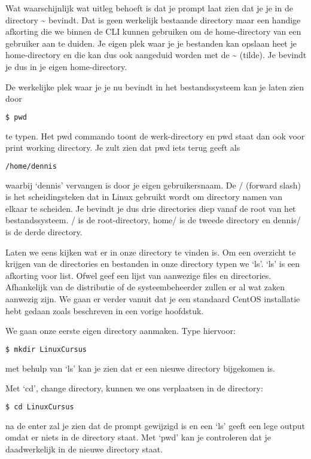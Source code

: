 Wat waarschijnlijk wat uitleg behoeft is dat je prompt laat zien dat je je in de directory \~{} bevindt. Dat is geen
werkelijk bestaande directory maar een handige afkorting die we binnen de CLI kunnen gebruiken om de home-directory van
een gebruiker aan te duiden. Je eigen plek waar je je bestanden kan opslaan heet je home-directory en die kan dus ook
aangeduid worden met de \~{} (tilde). Je bevindt je dus in je eigen home-directory.

De werkelijke plek waar je je nu bevindt in het bestandssysteem kan je laten zien door
\begin{lstlisting}[language=bash]
$ pwd
\end{lstlisting}
te typen. Het pwd commando toont de werk-directory en pwd staat dan ook voor print working directory. Je zult zien dat
pwd iets terug geeft als
\begin{lstlisting}[language=bash]
/home/dennis
\end{lstlisting}
waarbij `dennis' vervangen is door je eigen gebruikersnaam. De / (forward slash) is het scheidingsteken dat in Linux
gebruikt wordt om directory namen van elkaar te scheiden. Je bevindt je dus drie directories diep vanaf de root van het
bestandssysteem. / is de root-directory, home/ is de tweede directory en dennis/ is de derde directory.

Laten we eens kijken wat er in onze directory te vinden is. Om een overzicht te krijgen van de directories en bestanden
in onze directory typen we `ls'. `ls' is een afkorting voor list. Ofwel geef een lijst van aanwezige files en
directories. Afhankelijk van de distributie of de systeembeheerder zullen er al wat zaken aanwezig zijn. We gaan er
verder vanuit dat je een standaard CentOS installatie hebt gedaan zoals beschreven in een vorige hoofdstuk.

We gaan onze eerste eigen directory aanmaken. Type hiervoor:
\begin{lstlisting}[language=bash]
$ mkdir LinuxCursus
\end{lstlisting}
met behulp van `ls' kan je zien dat er een nieuwe directory bijgekomen is.

Met `cd', change directory, kunnen we ons verplaatsen in de directory:
\begin{lstlisting}[language=bash]
$ cd LinuxCursus
\end{lstlisting}
na de enter zal je zien dat de prompt gewijzigd is en een `ls' geeft een lege output omdat er
niets in de directory staat. Met `pwd' kan je controleren dat je daadwerkelijk in de nieuwe directory staat.

